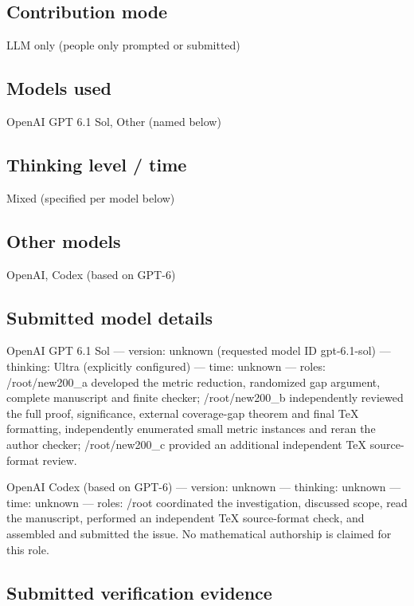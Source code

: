 \documentclass[11pt]{article}
\begin{document}
\subsection{Contribution mode}

LLM only (people only prompted or submitted)

\subsection{Models used}

OpenAI GPT 6.1 Sol, Other (named below)

\subsection{Thinking level / time}

Mixed (specified per model below)

\subsection{Other models}

OpenAI, Codex (based on GPT-6)

\subsection{Submitted model details}

OpenAI GPT 6.1 Sol  —  version: unknown (requested model ID gpt-6.1-sol)  —  thinking: Ultra (explicitly configured)  —  time: unknown  —  roles: /root/new200\_a developed the metric reduction, randomized gap argument, complete manuscript and finite checker; /root/new200\_b independently reviewed the full proof, significance, external coverage-gap theorem and final TeX formatting, independently enumerated small metric instances and reran the author checker; /root/new200\_c provided an additional independent TeX source-format review.

OpenAI Codex (based on GPT-6)  —  version: unknown  —  thinking: unknown  —  time: unknown  —  roles: /root coordinated the investigation, discussed scope, read the manuscript, performed an independent TeX source-format check, and assembled and submitted the issue. No mathematical authorship is claimed for this role.

\subsection{Submitted verification evidence}
\end{document}
